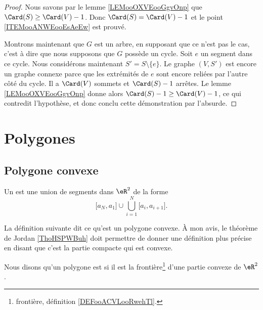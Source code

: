 \begin{proof}
	Nous savons par le lemme \ref{LEMooOXVEooGgvOnp} que \( \Card(S)\geq \Card(V)-1\). Donc \( \Card(S)=\Card(V)-1\) et le point \ref{ITEMooANWEooEsAeEw} est prouvé.

	Montrons maintenant que \( G\) est un arbre, en supposant que ce n'est pas le cas, c'est à dire que nous supposons que \( G\) possède un cycle. Soit \( e\) un segment dans ce cycle. Nous considérons maintenant \( S'=S\setminus\{ e \}\). Le graphe \( (V,S')\) est encore un graphe connexe parce que les extrémités de \( e\) sont encore reliées par l'autre côté du cycle. Il a \( \Card(V)\) sommets et \( \Card(S)-1\) arrêtes. Le lemme \ref{LEMooOXVEooGgvOnp} donne alors \( \Card(S)-1\geq \Card(V)-1\), ce qui contredit l'hypothèse, et donc conclu cette démonstration par l'absurde.
\end{proof}


\section{Polygones}


\subsection{Polygone convexe}

\begin{definition}        \label{DEFooBCSKooABKKtR}
	Un  est une union de segments dans \( \eR^2\) de la forme
	\begin{equation}
		\mathopen[ a_N , a_1 \mathclose]\cup\bigcup_{i=1}^N\mathopen[ a_i , a_{i+1} \mathclose].
	\end{equation}
\end{definition}

La définition suivante dit ce qu'est un polygone convexe. À mon avis, le théorème de Jordan \ref{ThoHSPWBuh} doit permettre de donner une définition plus précise en disant que c'est la partie compacte qui est convexe.
\begin{definition}      \label{DEFooBCDPooXTpbFq}
	Nous disons qu'un polygone est  si il est la frontière\footnote{frontière, définition \ref{DEFooACVLooRwehTl}.} d'une partie convexe de \( \eR^2\).
\end{definition}

